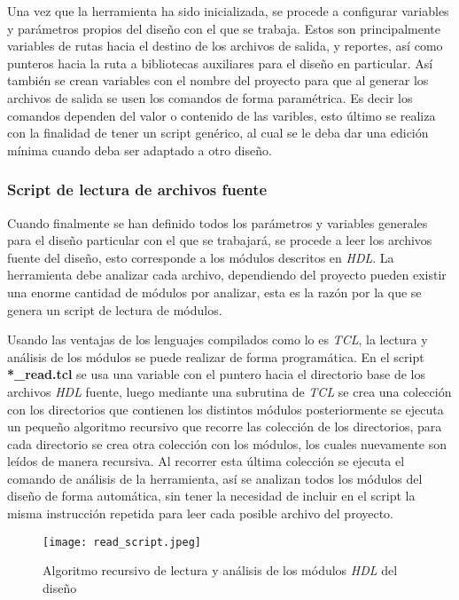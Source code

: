 Una vez que la herramienta ha sido inicializada, se procede a configurar variables y parámetros propios del diseño con el que se trabaja. Estos son principalmente variables de rutas hacia el destino de los archivos de salida, y reportes, así como punteros hacia la ruta a bibliotecas auxiliares para el diseño en particular. Así también se crean variables con el nombre del proyecto para que al generar los archivos de salida se usen los comandos de forma paramétrica. Es decir los comandos dependen del valor o contenido de las varibles, esto último se realiza con la finalidad de tener un script genérico, al cual se le deba dar una edición mínima cuando deba ser adaptado a otro diseño.

\subsubsection{Script de lectura de archivos fuente}

Cuando finalmente se han definido todos los parámetros y variables generales para el diseño particular con el que se trabajará, se procede a leer los archivos fuente del diseño, esto corresponde a los módulos descritos en \textit{HDL}. La herramienta debe analizar cada archivo, dependiendo del proyecto pueden existir una enorme cantidad de módulos por analizar, esta es la razón por la que se genera un script de lectura de módulos.

Usando las ventajas de los lenguajes compilados como lo es \textit{TCL}, la lectura y análisis de los módulos se puede realizar de forma programática. En el script \textbf{*\_read.tcl} se usa una variable con el puntero hacia el directorio base de los archivos \textit{HDL} fuente, luego mediante una subrutina de \textit{TCL} se crea una colección con los directorios que contienen los distintos módulos posteriormente se ejecuta un pequeño algoritmo recursivo que recorre las colección de los directorios, para cada directorio se crea otra colección con los módulos, los cuales nuevamente son leídos de manera recursiva. Al recorrer esta última colección se ejecuta el comando de análisis de la herramienta, así se analizan todos los módulos del diseño de forma automática, sin tener la necesidad de incluir en el script la misma instrucción repetida para leer cada posible archivo del proyecto.

\begin{figure}[h]
\texttt{[image: read\_script.jpeg]}
\centering
\caption{Algoritmo recursivo de lectura y análisis de los módulos \textit{HDL} del diseño}
\label{s_read}
\end{figure}

